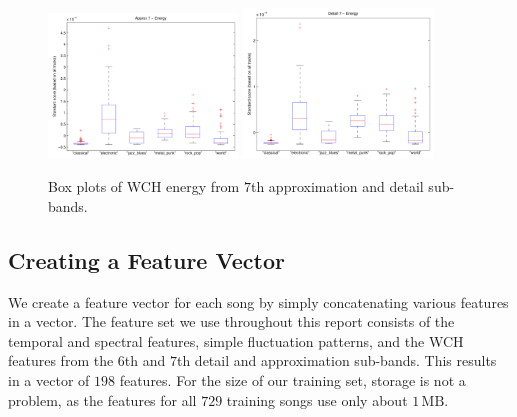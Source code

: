 \documentclass[12pt]{article}
\begin{document}
\begin{figure}[h!]
   \centering
   \includegraphics[width=0.45\textwidth]{figures/wch_box_08.pdf}
   \includegraphics[width=0.45\textwidth]{figures/wch_box_16.pdf}
   \caption{Box plots of WCH energy from $7$th approximation and detail sub-bands.}
   \label{fig:wch_box}
\end{figure}

\subsection{Creating a Feature Vector}

We create a feature vector for each song by simply concatenating various features in a vector.  The feature set we use throughout this report consists of the temporal and spectral features, simple fluctuation patterns, and the WCH features from the $6$th and $7$th detail and approximation sub-bands.  This results in a vector of $198$ features.  For the size of our training set, storage is not a problem, as the features for all $729$ training songs use only about $1\,\text{MB}$.
\end{document}
